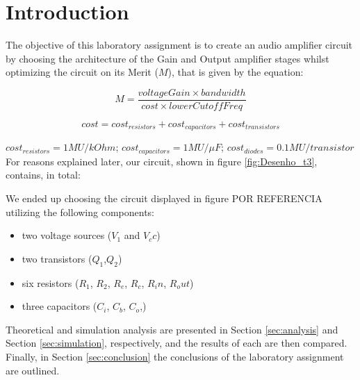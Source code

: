 
\section{Introduction}
\label{sec:introduction}



The objective of this laboratory assignment is to create an audio amplifier circuit by choosing the architecture of the Gain and Output amplifier stages whilst optimizing the circuit on its Merit ($M$), that is given by the equation:

\[
M = \frac{voltageGain\times bandwidth}{cost\times lowerCutoffFreq}
\]

\[
 cost = cost_{resistors} + cost_{capacitors} + cost_{transistors} 
\]

$cost_{resistors} = 1MU/kOhm$; $cost_{capacitors} = 1MU/\mu F$;
$cost_{diodes} = 0.1MU/transistor$ \\

For reasons explained later, our circuit, shown in figure \ref{fig:Desenho_t3}, contains,
in total:

We ended up choosing the circuit displayed in figure POR REFERENCIA utilizing the following components:

\begin{itemize}
	\item two voltage sources ($V_1$ and $V_cc$)
	\item two transistors ($Q_1$,$Q_2$)
	\item six resistors ($R_1$, $R_2$, $R_e$, $R_c$, $R_in$, $R_out$)
	\item three capacitors ($C_i$, $C_b$, $C_o$,)
\end{itemize}


Theoretical and simulation analysis are presented in Section \ref{sec:analysis} and Section \ref{sec:simulation}, respectively, and the results of each are then compared.
Finally, in Section \ref{sec:conclusion} the conclusions of the laboratory assignment are outlined. 





